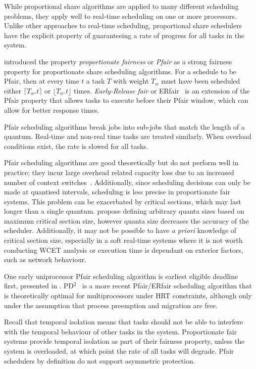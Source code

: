 While proportional share algorithms are applied to many different scheduling problems, they apply
well to real-time scheduling on one or more processors.
Unlike other approaches to real-time scheduling, proportional share schedulers have the explicit property of guaranteeing a rate of progress for all tasks in the system.

\citet{Baruah_CPV_96} introduced the property \emph{proportionate fairness} or \emph{Pfair} as a
strong fairness property for proportionate share scheduling algorithms.  For a schedule to be Pfair,
then at every time $t$ a task $T$ with weight $T_{w}$ must have been scheduled either $\lceil T_{w}
. t \rceil$ or $\lfloor T_{w}.t \rfloor $ times.  \emph{Early-Release fair} or
ERfair~\citep{Anderson_Srinivasan_04} is an extension of the Pfair property that allows tasks to
execute before their Pfair window, which can allow for better response times.

Pfair scheduling algorithms break jobs into sub-jobs that match the length of a quantum.
Real-time and non-real time tasks are treated similarly.
When overload conditions exist, the rate is slowed for all tasks.

Pfair scheduling algorithms are good theoretically but do not perform well in practice; they incur
large overhead related capacity loss due to an increased number of context
switches~\citep{Abeni_Buttazzo_04}. Additionally, since
scheduling decisions can only be made at quantised intervals, scheduling is less precise in
proportionate fair systems.  This problem can be exacerbated by critical sections, which may last
longer than a single quantum.  \citet{Stoica_AKBGP_96} propose defining arbitrary quanta sizes based
on maximum critical section size, however quanta size decreases the accuracy of the scheduler.
Additionally, it may not be possible to have \emph{a priori} knowledge of critical section size, especially
in a soft real-time systems where it is not worth conducting \gls{WCET} analysis or execution time
is dependant on exterior factors, such as network behaviour.

One early uniprocessor Pfair scheduling algorithm is earliest eligible deadline first, presented in
\citet{Stoica_AKBGP_96}.  PD$^{2}$~\citep{Srinivasan_Anderson_06} is a more recent Pfair/ERfair
scheduling algorithm that is theoretically optimal for multiprocessors under \gls{HRT} constraints,
although only under the assumption that process preemption and migration are free.

Recall that temporal isolation means that tasks should not be able to interfere with the temporal
behaviour of other tasks in the system.  Proportionate fair systems provide temporal isolation as
part of their fairness property, unless the system is overloaded, at which point the rate of all
tasks will degrade. Pfair schedulers by definition do not support asymmetric protection.

